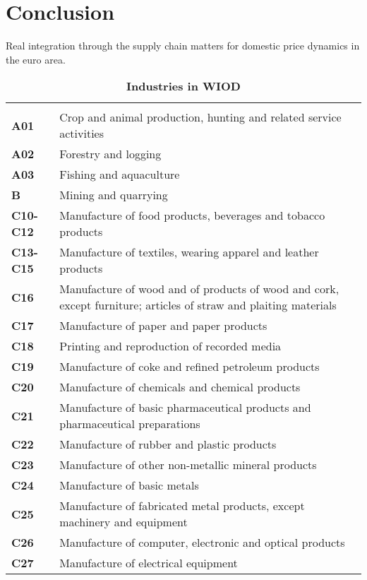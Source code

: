 \documentclass[11pt,a4paper]{article}
\begin{document}
\section{Conclusion}
\label{sec:ccl}
Real integration through the supply chain matters for domestic price dynamics in the euro area.

\newpage

\newpage
{}
\begin{table}[!h]
 \centering
 \caption{\footnotesize{\textbf{Industries in WIOD}}}
 \footnotesize
 \begin{tabular}{ll}
  \hline \\
\textbf{A01} &{Crop and animal production, hunting and related service activities}\\
\textbf{A02} &{Forestry and logging}\\
\textbf{A03} &{Fishing and aquaculture}\\
\textbf{B} &{Mining and quarrying}\\
\textbf{C10-C12} &{Manufacture of food products, beverages and tobacco products}\\
\textbf{C13-C15} &{Manufacture of textiles, wearing apparel and leather products}\\
\textbf{C16} &{Manufacture of wood and of products of wood and cork, except furniture; articles of straw and plaiting materials}\\
\textbf{C17} &{Manufacture of paper and paper products}\\
\textbf{C18} &{Printing and reproduction of recorded media}\\
\textbf{C19} &{Manufacture of coke and refined petroleum products}\\
\textbf{C20} &{Manufacture of chemicals and chemical products}\\
\textbf{C21} &{Manufacture of basic pharmaceutical products and pharmaceutical preparations}\\
\textbf{C22} &{Manufacture of rubber and plastic products}\\
\textbf{C23} &{Manufacture of other non-metallic mineral products}\\
\textbf{C24} &{Manufacture of basic metals}\\
\textbf{C25} &{Manufacture of fabricated metal products, except machinery and equipment}\\
\textbf{C26} &{Manufacture of computer, electronic and optical products}\\
\textbf{C27} &{Manufacture of electrical equipment}\\

\end{tabular}
\end{table}
\end{document}
